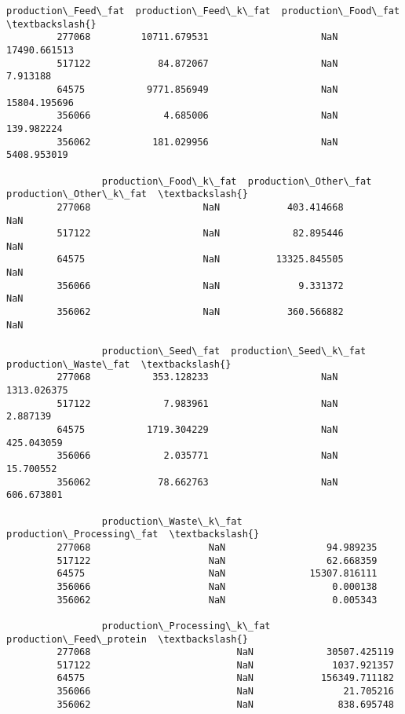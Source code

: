 \documentclass[11pt]{article}
\begin{document}
\begin{Verbatim}[commandchars=\\\{\}]
                 production\_Feed\_fat  production\_Feed\_k\_fat  production\_Food\_fat  \textbackslash{}
         277068         10711.679531                    NaN         17490.661513   
         517122            84.872067                    NaN             7.913188   
         64575           9771.856949                    NaN         15804.195696   
         356066             4.685006                    NaN           139.982224   
         356062           181.029956                    NaN          5408.953019   
         
                 production\_Food\_k\_fat  production\_Other\_fat  production\_Other\_k\_fat  \textbackslash{}
         277068                    NaN            403.414668                     NaN   
         517122                    NaN             82.895446                     NaN   
         64575                     NaN          13325.845505                     NaN   
         356066                    NaN              9.331372                     NaN   
         356062                    NaN            360.566882                     NaN   
         
                 production\_Seed\_fat  production\_Seed\_k\_fat  production\_Waste\_fat  \textbackslash{}
         277068           353.128233                    NaN           1313.026375   
         517122             7.983961                    NaN              2.887139   
         64575           1719.304229                    NaN            425.043059   
         356066             2.035771                    NaN             15.700552   
         356062            78.662763                    NaN            606.673801   
         
                 production\_Waste\_k\_fat  production\_Processing\_fat  \textbackslash{}
         277068                     NaN                  94.989235   
         517122                     NaN                  62.668359   
         64575                      NaN               15307.816111   
         356066                     NaN                   0.000138   
         356062                     NaN                   0.005343   
         
                 production\_Processing\_k\_fat  production\_Feed\_protein  \textbackslash{}
         277068                          NaN             30507.425119   
         517122                          NaN              1037.921357   
         64575                           NaN            156349.711182   
         356066                          NaN                21.705216   
         356062                          NaN               838.695748   
         

\end{Verbatim}
\end{document}
